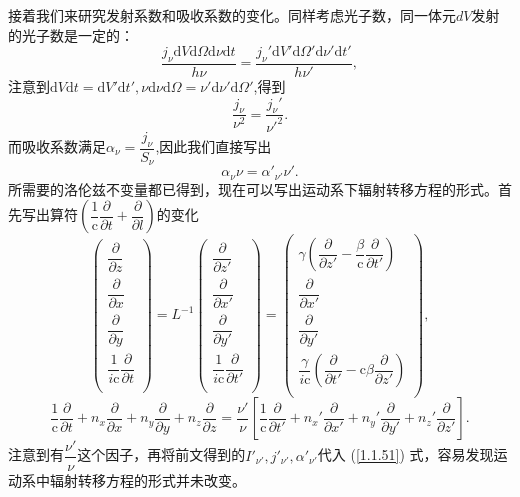 \documentclass[../天体物理基础.tex]{subfiles}
\begin{document}
接着我们来研究发射系数和吸收系数的变化。同样考虑光子数，同一体元$dV$发射的光子数是一定的：
\begin{equation}
\frac{j_\nu\mathrm{d}V\mathrm{d}\Omega\mathrm{d}\nu\mathrm{d}t}{h\nu}=\frac{j_\nu'\mathrm{d}V'\mathrm{d}\Omega'\mathrm{d}\nu'\mathrm{d}t'}{h\nu'},
\end{equation}
注意到$\mathrm{d}V\mathrm{d}t=\mathrm{d}V'\mathrm{d}t',\nu\mathrm{d}\nu\mathrm{d}\Omega=\nu'\mathrm{d}\nu'\mathrm{d}\Omega'$,得到
\begin{equation}
\frac{j_\nu}{\nu^2}=\frac{j_\nu'}{\nu'^2}.
\end{equation}
而吸收系数满足$\alpha_{\nu}=\dfrac{j_{\nu}}{S_{\nu}}$,因此我们直接写出
\begin{equation}
\alpha_{\nu}\nu=\alpha'_{\nu'}\nu'.
\end{equation}
所需要的洛伦兹不变量都已得到，现在可以写出运动系下辐射转移方程的形式。首先写出算符$\left(\dfrac{1}{\mathrm{c}}\dfrac{\partial{}}{\partial{}t}+\dfrac{\partial{}}{\partial{}l}\right)$的变化
\begin{equation}
\begin{pmatrix}
\dfrac{\partial}{\partial z}\\
\dfrac{\partial}{\partial x}\\
\dfrac{\partial}{\partial y}\\
\dfrac1{i\mathrm{c}}\dfrac{\partial}{\partial t}\\
\end{pmatrix}
=L^{-1}
\begin{pmatrix}
\dfrac{\partial}{\partial z'}\\
\dfrac{\partial}{\partial x'}\\
\dfrac{\partial}{\partial y'}\\
\dfrac1{i\mathrm{c}}\dfrac{\partial}{\partial t'}\\
\end{pmatrix}
=\begin{pmatrix}
\gamma(\dfrac{\partial}{\partial z'}-\dfrac{\beta}{\mathrm{c}}\dfrac{\partial}{\partial t'})\\
\dfrac{\partial}{\partial x'}\\
\dfrac{\partial}{\partial y'}\\
\dfrac\gamma{i\mathrm{c}}(\dfrac{\partial}{\partial t'}-\mathrm{c}\beta\dfrac{\partial}{\partial z'})\\
\end{pmatrix},
\end{equation}
\begin{equation}
\frac{1}{\mathrm{c}}\frac{\partial }{\partial t}+n_{x}\frac{\partial}{\partial x}+n_{y}\frac{\partial}{\partial y}+n_{z}\frac{\partial}{\partial z}=\frac{\nu'}{\nu}\left[\frac{1}{\mathrm{c}}\frac{\partial}{\partial t'}+n_{x}'\frac{\partial}{\partial x'}+n_{y}'\frac{\partial}{\partial y'}+n_{z}'\frac{\partial}{\partial z'}\right].
\end{equation}
注意到有$\dfrac{\nu'}{\nu}$这个因子，再将前文得到的$I'_{\nu'},j'_{\nu'},\alpha'_{\nu'}$代入 (\ref{1.1.51}) 式，容易发现运动系中辐射转移方程的形式并未改变。
\end{document}
